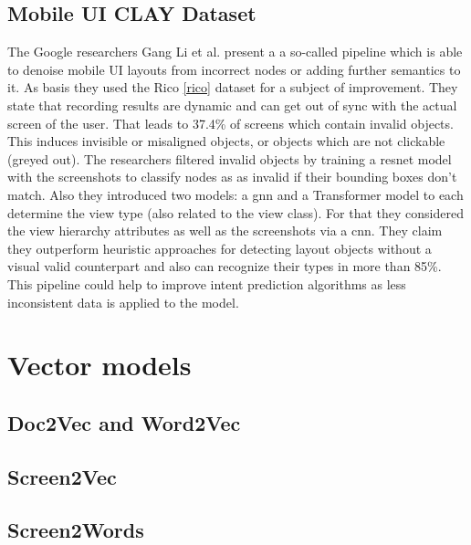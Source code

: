 \subsection{Mobile UI CLAY Dataset}

The Google researchers Gang Li et al. \cite{clay} present a a so-called  pipeline which is able to denoise mobile UI layouts from incorrect nodes or adding further semantics to it.
As basis they used the Rico \ref{rico} dataset for a subject of improvement.
They state that recording results are dynamic and can get out of sync with the actual screen of the user.
That leads to 37.4\% of screens which contain invalid objects.
This induces invisible or misaligned objects, or objects which are not clickable (greyed out).
The researchers filtered invalid objects by training a \gls{resnet} model with the screenshots to classify nodes as as invalid if their bounding boxes don't match.
Also they introduced two models: a \gls{gnn} and a Transformer model to each determine the view type (also related to the view class).
For that they considered the view hierarchy attributes as well as the screenshots via a \gls{cnn}.
They claim they outperform heuristic approaches for detecting layout objects without a visual valid counterpart and also can recognize their types in more than 85\%.
This pipeline could help to improve intent prediction algorithms as less inconsistent data is applied to the model.


\section{Vector models}

\subsection{Doc2Vec and Word2Vec}
\cite{le2014distributed}

\subsection{Screen2Vec}
\cite{li2021screen2vec}

\subsection{Screen2Words}

